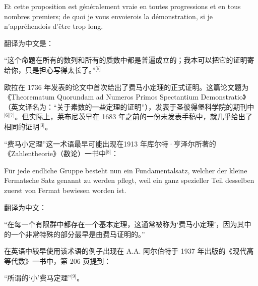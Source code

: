 Et cette proposition est généralement vraie en toutes progressions et en tous nombres premiers; de quoi je vous envoierois la démonstration, si je n'appréhendois d'être trop long.

翻译为中文是：

“这个命题在所有的数列和所有的质数中都是普遍成立的；我本可以把它的证明寄给你，只是担心写得太长了。”\(^\text{[5]}\)

欧拉在 1736 年发表的论文中首次给出了费马小定理的正式证明。这篇论文题为 《Theorematum Quorundam ad Numeros Primos Spectantium Demonstratio》（英文译名为：“关于素数的一些定理的证明”），发表于圣彼得堡科学院的期刊中\(^\text{[6][7]}\)。但实际上，莱布尼茨早在 1683 年之前的一份未发表手稿中，就几乎给出了相同的证明\(^\text{[3]}\)。

“费马小定理”这一术语最早可能出现在1913 年库尔特·亨泽尔所著的《Zahlentheorie》（数论）一书中\(^\text{[8]}\)：

Für jede endliche Gruppe besteht nun ein Fundamentalsatz, welcher der kleine Fermatsche Satz genannt zu werden pflegt, weil ein ganz spezieller Teil desselben zuerst von Fermat bewiesen worden ist.

翻译为中文：

“在每一个有限群中都存在一个基本定理，这通常被称为‘费马小定理’，因为其中的一个非常特殊的部分最早是由费马证明的。”

在英语中较早使用该术语的例子出现在 A.A. 阿尔伯特于 1937 年出版的《现代高等代数》一书中，第 206 页提到：

“所谓的‘小’费马定理”\(^\text{[9]}\)。

